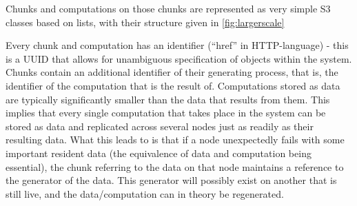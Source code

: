 Chunks and computations on those chunks are represented as very simple S3 classes based on lists, with their structure given in \cref{fig:largerscale}


Every chunk and computation has an identifier (``href'' in HTTP-language) - this is a UUID that allows for unambiguous specification of objects within the system.
Chunks contain an additional identifier of their generating process, that is, the identifier of the computation that is the result of.
Computations stored as data are typically significantly smaller than the data that results from them.
This implies that every single computation that takes place in the system can be stored as data and replicated across several nodes just as readily as their resulting data.
What this leads to is that if a node unexpectedly fails with some important resident data (the equivalence of data and computation being essential), the chunk referring to the data on that node maintains a reference to the generator of the data.
This generator will possibly exist on another that is still live, and the data/computation can in theory be regenerated.
